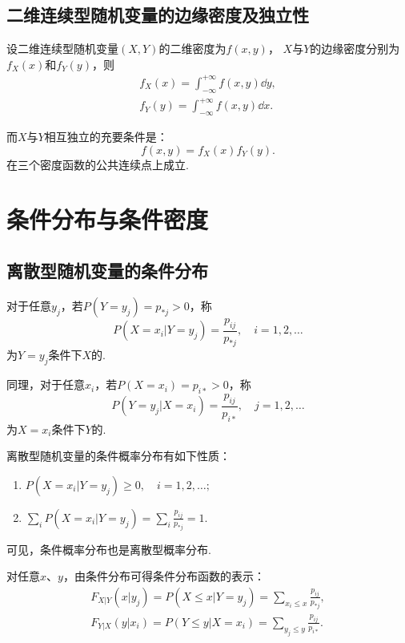 \subsection{二维连续型随机变量的边缘密度及独立性}
\begin{theorem}
设二维连续型随机变量\((X,Y)\)的二维密度为\(f(x,y)\)，
\(X\)与\(Y\)的边缘密度分别为\(f_X(x)\)和\(f_Y(y)\)，则
\begin{align*}
f_X(x) = \int_{-\infty}^{+\infty} f(x,y) \dd{y}, \\
f_Y(y) = \int_{-\infty}^{+\infty} f(x,y) \dd{x}.
\end{align*}

而\(X\)与\(Y\)相互独立的充要条件是：\[
f(x,y) = f_X(x) f_Y(y).
\]在三个密度函数的公共连续点上成立.
\end{theorem}

\section{条件分布与条件密度}
\subsection{离散型随机变量的条件分布}
\begin{definition}
对于任意\(y_j\)，若\(P(Y=y_j) = p_{*j} > 0\)，称\[
P(X=x_i \vert Y=y_j) = \frac{p_{ij}}{p_{*j}}, \quad i=1,2,\dotsc
\]为\(Y=y_j\)条件下\(X\)的.

同理，对于任意\(x_i\)，若\(P(X=x_i) = p_{i*} > 0\)，称\[
P(Y=y_j \vert X=x_i) = \frac{p_{ij}}{p_{i*}}, \quad j=1,2,\dotsc
\]为\(X=x_i\)条件下\(Y\)的.
\end{definition}

\begin{property}
离散型随机变量的条件概率分布有如下性质：
\begin{enumerate}
\item \(P(X=x_i \vert Y=y_j) \geq 0, \quad i=1,2,\dotsc;\)
\item \(\sum_{i}{P(X=x_i \vert Y=y_j)} = \sum_{i}{\frac{p_{ij}}{p_{*j}}} = 1.\)
\end{enumerate}
可见，条件概率分布也是离散型概率分布.
\end{property}

\begin{theorem}
对任意\(x\)、\(y\)，由条件分布可得条件分布函数的表示：
\begin{align*}
F_{X \vert Y}(x \vert y_j) = P(X \leq x \vert Y=y_j) = \sum_{x_i \leq x}{\frac{p_{ij}}{p_{*j}}}, \\
F_{Y \vert X}(y \vert x_i) = P(Y \leq y \vert X=x_i) = \sum_{y_j \leq y}{\frac{p_{ij}}{p_{i*}}}.
\end{align*}
\end{theorem}

